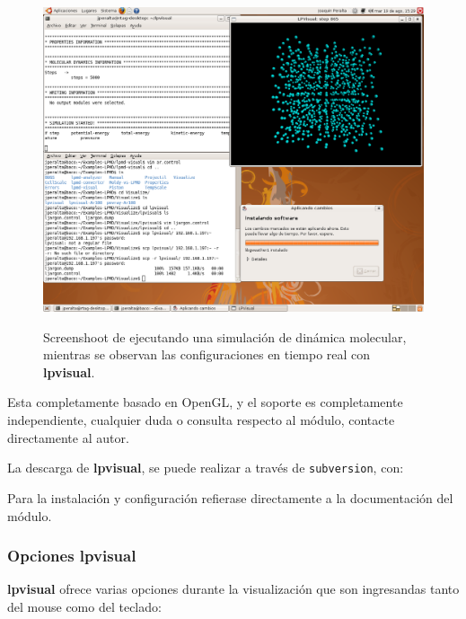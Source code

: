 \begin{figure}[h!]
 \centering
 \includegraphics[scale=.25]{lpvisual.png}
 \label{fig:lpvisual}
 \caption{Screenshoot de {\lpmd} ejecutando una simulaci\'on de din\'amica molecular, mientras se observan las configuraciones en tiempo real con \textbf{lpvisual}.}
\end{figure}

Esta completamente basado en OpenGL, y el soporte es completamente independiente, cualquier duda o consulta respecto al m\'odulo, contacte directamente al autor.

La descarga de \textbf{lpvisual}, se puede realizar a trav\'es de \verb|subversion|, con:


Para la instalaci\'on y configuraci\'on refierase directamente a la documentaci\'on del m\'odulo.

\subsubsection{Opciones lpvisual}
{\bf lpvisual} ofrece varias opciones durante la visualizaci\'on que son ingresandas tanto del mouse como del teclado:\\

